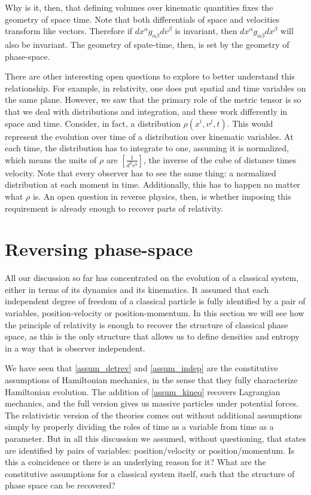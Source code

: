 Why is it, then, that defining volumes over kinematic quantities fixes the geometry of space time. Note that both differentials of space and velocities transform like vectors. Therefore if $dx^\alpha g_{\alpha\beta} dv^\beta$ is invariant, then $dx^\alpha g_{\alpha\beta} dx^\beta$ will also be invariant. The geometry of spate-time, then, is set by the geometry of phase-space.

There are other interesting open questions to explore to better understand this relationship. For example, in relativity, one does put spatial and time variables on the same plane. However, we saw that the primary role of the metric tensor is so that we deal with distributions and integration, and these work differently in space and time. Consider, in fact, a distribution $\rho(x^i, v^j, t)$. This would represent the evolution over time of a distribution over kinematic variables. At each time, the distribution has to integrate to one, assuming it is normalized, which means the units of $\rho$ are $\left[\frac{1}{d^3v^3}\right]$, the inverse of the cube of distance times velocity. Note that every observer has to see the same thing: a normalized distribution at each moment in time. Additionally, this has to happen no matter what $\rho$ is. An open question in reverse physics, then, is whether imposing this requirement is already enough to recover parts of relativity.

\section{Reversing phase-space}

All our discussion so far has concentrated on the evolution of a classical system, either in terms of its dynamics and its kinematics. It assumed that each independent degree of freedom of a classical particle is fully identified by a pair of variables, position-velocity or position-momentum. In this section we will see how the principle of relativity is enough to recover the structure of classical phase space, as this is the only structure that allows us to define densities and entropy in a way that is observer independent.

We have seen that \ref{assum_detrev} and \ref{assum_indep} are the constitutive assumptions of Hamiltonian mechanics, in the sense that they fully characterize Hamiltonian evolution. The addition of \ref{assum_kineq} recovers Lagrangian mechanics, and the full version gives us massive particles under potential forces. The relativistic version of the theories comes out without additional assumptions simply by properly dividing the roles of time as a variable from time as a parameter. But in all this discussion we assumed, without questioning, that states are identified by pairs of variables: position/velocity or position/momentum. Is this a coincidence or there is an underlying reason for it? What are the constitutive assumptions for a classical system itself, such that the structure of phase space can be recovered?

